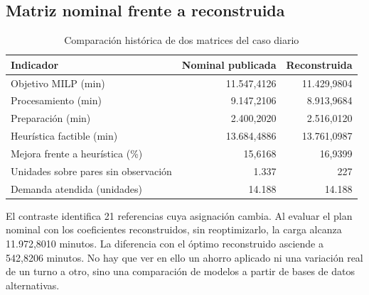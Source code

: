 \documentclass[12pt,a4paper,oneside]{article}
\begin{document}
\subsection{Matriz nominal frente a reconstruida}
\begin{table}[H]\centering\small
\caption{Comparación histórica de dos matrices del caso diario}
\begin{tabular}{lrr}\toprule
Indicador & Nominal publicada & Reconstruida\\\midrule
Objetivo MILP (min) &11.547,4126&11.429,9804\\
Procesamiento (min)&9.147,2106&8.913,9684\\
Preparación (min)&2.400,2020&2.516,0120\\
Heurística factible (min)&13.684,4886&13.761,0987\\
Mejora frente a heurística (\%)&15,6168&16,9399\\
Unidades sobre pares sin observación&1.337&227\\
Demanda atendida (unidades)&14.188&14.188\\\bottomrule
\end{tabular}
\end{table}
El contraste identifica 21 referencias cuya asignación cambia. Al evaluar el plan nominal con los coeficientes reconstruidos, sin reoptimizarlo, la carga alcanza 11.972,8010 minutos. La diferencia con el óptimo reconstruido asciende a 542,8206 minutos. No hay que ver en ello un ahorro aplicado ni una variación real de un turno a otro, sino una comparación de modelos a partir de bases de datos alternativas.
\end{document}
